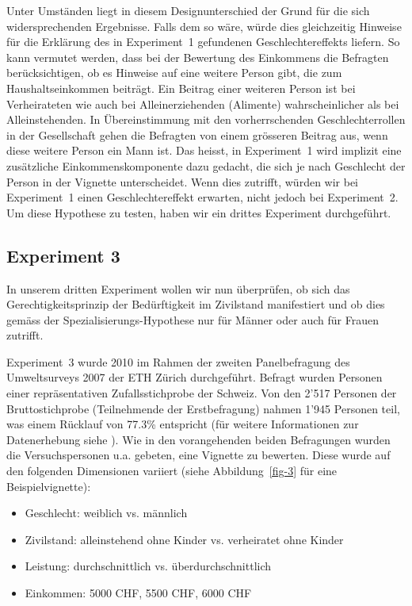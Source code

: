 \documentclass[a4paper,12pt]{article}
\renewcommand{\baselinestretch}{1.1}
\newif\ifcomments
\newcommand{\comment}[1]{%
    \ifcomments\marginpar{\renewcommand{\baselinestretch}{1}\tiny\hspace*{-1.1em}\colorbox{gray!20}%
    {\textcolor{red}{\parbox[t]{.9in}{\raggedright #1}}}}\fi}
\begin{document}
Unter Umständen liegt in diesem Designunterschied der Grund für die sich
widersprechenden Ergebnisse. Falls dem so wäre, würde dies gleichzeitig
Hinweise für die Erklärung des in Experiment~1 gefundenen Geschlechtereffekts
liefern. So kann vermutet werden, dass bei der Bewertung des Einkommens die
Befragten berücksichtigen, ob es Hinweise auf eine weitere Person gibt, die zum
Haushaltseinkommen beiträgt. Ein Beitrag einer weiteren Person ist bei
Verheirateten wie auch bei Alleinerziehenden (Alimente) wahrscheinlicher als
bei Alleinstehenden. In Übereinstimmung mit den vorherrschenden
Geschlechterrollen in der Gesellschaft gehen die Befragten von einem grösseren
Beitrag aus, wenn diese weitere Person ein Mann ist. Das heisst, in Experiment~1 
wird implizit eine zusätzliche Einkommenskomponente dazu gedacht, die sich je
nach Geschlecht der Person in der Vignette unterscheidet. Wenn dies zutrifft,
würden wir bei Experiment~1 einen Geschlechtereffekt erwarten, nicht jedoch bei
Experiment~2. Um diese Hypothese zu testen, haben wir ein drittes Experiment
durchgeführt.
\comment{copy-paste aus deinen PPT von Luzern 2014}
\comment{Wobei heutzutage bekommt man kaum mehr Alimente (aber das wissen die
    Leute vielleicht nicht – wusste ich jedenfalls nicht, bis ich da im
    Scheidungsprojekt mit Dorian gearbeitet habe)}


\subsection{Experiment 3}
\comment{Teile der Beschreibung der Daten könnten in den Abschnitt „Daten und Methode“}
\comment{„Offizielle“ Version der Umweltsurveys verwenden}

In unserem dritten Experiment wollen wir nun überprüfen, ob sich das
Gerechtigkeitsprinzip der Bedürftigkeit im Zivilstand manifestiert und ob dies
gemäss der Spezialisierungs-Hypothese nur für Männer oder auch für Frauen
zutrifft.

Experiment~3 wurde 2010 im Rahmen der zweiten Panelbefragung des Umweltsurveys
2007 der ETH Zürich durchgeführt. Befragt wurden Personen einer repräsentativen
Zufallsstichprobe der Schweiz. Von den 2'517 Personen der Bruttostichprobe
(Teilnehmende der Erstbefragung) nahmen 1'945 Personen teil, was einem Rücklauf
von 77.3\% entspricht (für weitere Informationen zur Datenerhebung siehe
\citealp{Diekmann-etal-2012}). Wie in den vorangehenden beiden Befragungen
wurden die Versuchspersonen u.a. gebeten, eine Vignette zu bewerten. Diese wurde
auf den folgenden Dimensionen variiert (siehe Abbildung~\ref{fig-3} für eine Beispielvignette):
\comment{Tabelle zu Faktoren wie bei Experiment 1}
\begin{itemize}
\item Geschlecht: weiblich vs. männlich
\item Zivilstand: alleinstehend ohne Kinder vs. verheiratet ohne Kinder
\item Leistung: durchschnittlich vs. überdurchschnittlich
\item Einkommen: 5000 CHF, 5500 CHF, 6000 CHF
\end{itemize}
\end{document}
